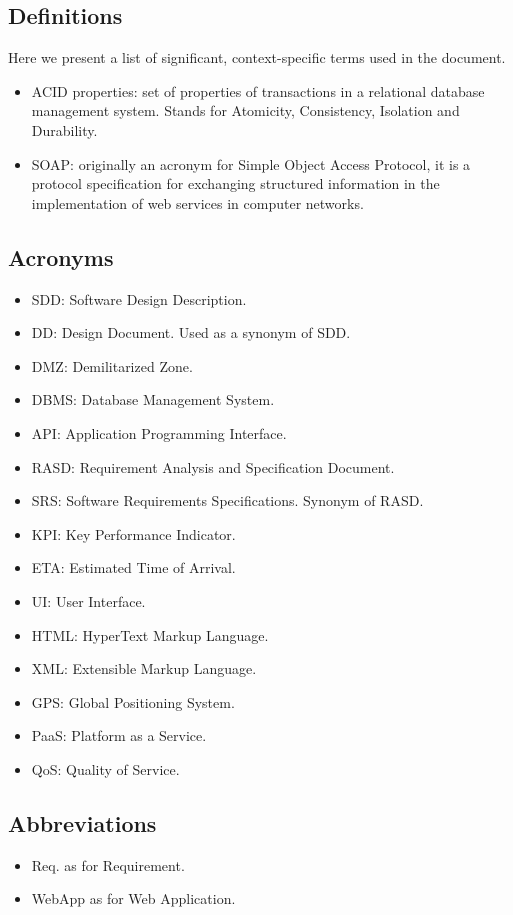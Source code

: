 \subsection{Definitions}
Here we present a list of significant, context-specific terms used in the document. 
\begin{itemize}
	\item ACID properties: set of properties of transactions in a relational database management system. Stands for Atomicity, Consistency, Isolation and Durability.
	\item SOAP: originally an acronym for Simple Object Access Protocol, it is a protocol specification for exchanging structured information in the implementation of web services in computer networks. 
\end{itemize}
\subsection{Acronyms}
\begin{itemize}
	\item SDD: Software Design Description.
	\item DD: Design Document. Used as a synonym of SDD.
	\item DMZ: Demilitarized Zone.
	\item DBMS: Database Management System.
	\item API: Application Programming Interface.
	\item RASD: Requirement Analysis and Specification Document.
	\item SRS: Software Requirements Specifications. Synonym of RASD.
	\item KPI: Key Performance Indicator.
	\item ETA: Estimated Time of Arrival.
	\item UI: User Interface.
	\item HTML: HyperText Markup Language.
	\item XML: Extensible Markup Language.
	\item GPS: Global Positioning System.
	\item PaaS: Platform as a Service.
	\item QoS: Quality of Service.
\end{itemize}
\subsection{Abbreviations}
\begin{itemize}
	\item Req. as for Requirement.
	\item WebApp as for Web Application.
\end{itemize}
